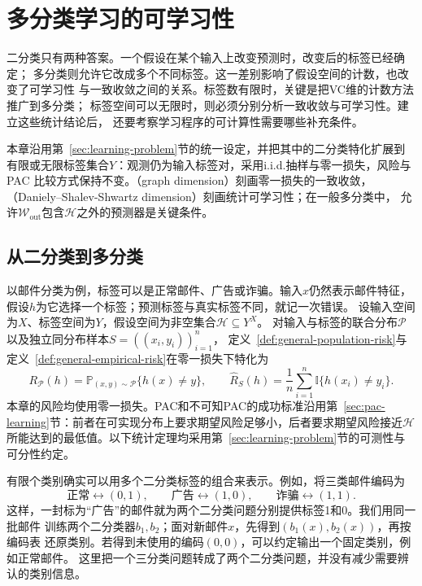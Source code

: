 \chapter{多分类学习的可学习性}
\label{chap:multiclass-learnability}

二分类只有两种答案。一个假设在某个输入上改变预测时，改变后的标签已经确定；
多分类则允许它改成多个不同标签。这一差别影响了假设空间的计数，也改变了可学习性
与一致收敛之间的关系。标签数有限时，关键是把VC维的计数方法推广到多分类；
标签空间可以无限时，则必须分别分析一致收敛与可学习性。建立这些统计结论后，
还要考察学习程序的可计算性需要哪些补充条件。

本章沿用第~\ref{sec:learning-problem}节的统一设定，并把其中的二分类特化扩展到
有限或无限标签集合$Y$：观测仍为输入标签对，采用i.i.d.抽样与零一损失，风险与PAC
比较方式保持不变。（graph dimension）刻画零一损失的一致收敛，
（Daniely--Shalev-Shwartz dimension）刻画统计可学习性；在一般多分类中，
允许$\mathcal W_{\mathrm{out}}$包含$\mathcal H$之外的预测器是关键条件。

\section{从二分类到多分类}
\label{sec:multiclass-setting}

以邮件分类为例，标签可以是正常邮件、广告或诈骗。输入$x$仍然表示邮件特征，
假设$h$为它选择一个标签；预测标签与真实标签不同，就记一次错误。
设输入空间为$X$、标签空间为$Y$，假设空间为非空集合$\mathcal H\subseteq Y^X$。
对输入与标签的联合分布$\mathcal P$以及独立同分布样本$S=((x_i,y_i))_{i=1}^n$，
定义~\ref{def:general-population-risk}与定义~\ref{def:general-empirical-risk}在零一损失下特化为
\begin{equation}
 R_{\mathcal P}(h)=\mathbb P_{(x,y)\sim\mathcal P}\{h(x)\neq y\},\qquad
 \hat R_S(h)=\frac1n\sum_{i=1}^n\mathbb I\{h(x_i)\neq y_i\}.
 \label{eq:multiclass-risk}
\end{equation}
本章的风险均使用零一损失。PAC和不可知PAC的成功标准沿用第~\ref{sec:pac-learning}节：前者在可实现分布上要求期望风险足够小，后者要求期望风险接近$\mathcal H$所能达到的最低值。以下统计定理均采用第~\ref{sec:learning-problem}节的可测性与可分性约定。

有限个类别确实可以用多个二分类标签的组合来表示。例如，将三类邮件编码为
\[
 \text{正常}\longleftrightarrow(0,1),\qquad
 \text{广告}\longleftrightarrow(1,0),\qquad
 \text{诈骗}\longleftrightarrow(1,1).
\]
这样，一封标为“广告”的邮件就为两个二分类问题分别提供标签1和0。我们用同一批邮件
训练两个二分类器$b_1,b_2$；面对新邮件$x$，先得到$(b_1(x),b_2(x))$，再按编码表
还原类别。若得到未使用的编码$(0,0)$，可以约定输出一个固定类别，例如正常邮件。
这里把一个三分类问题转成了两个二分类问题，并没有减少需要辨认的类别信息。

